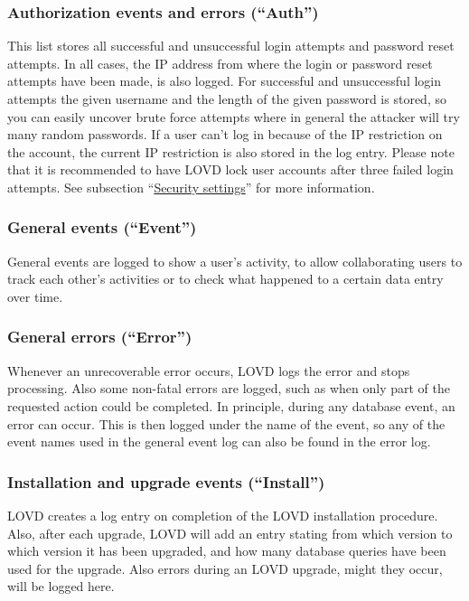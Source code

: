 \subsubsection{Authorization events and errors (``Auth'')}
This list stores all successful and unsuccessful login attempts and password reset attempts.
In all cases, the IP address from where the login or password reset attempts have been made, is also logged.
For successful and unsuccessful login attempts the given username and the length of the given password is stored,
 so you can easily uncover brute force attempts where in general the attacker will try many random passwords.
If a user can't log in because of the IP restriction on the account, the current IP restriction is also stored in the log entry.
Please note that it is recommended to have LOVD lock user accounts after three failed login attempts.
See subsection ``\hyperlink{ssec:security_settings}{Security settings}'' for more information.


\subsubsection{General events (``Event'')}
General events are logged to show a user's activity, to allow collaborating users to track each other's
 activities or to check what happened to a certain data entry over time.


\subsubsection{General errors (``Error'')}
Whenever an unrecoverable error occurs, LOVD logs the error and stops processing.
Also some non-fatal errors are logged, such as when only part of the requested action could be completed.
In principle, during any database event, an error can occur.
This is then logged under the name of the event, so any of the event names used in the general event log can also be found in the error log.

\subsubsection{Installation and upgrade events (``Install'')}
LOVD creates a log entry on completion of the LOVD installation procedure.
Also, after each upgrade, LOVD will add an entry stating from which version to which version it has been upgraded,
 and how many database queries have been used for the upgrade.
Also errors during an LOVD upgrade, might they occur, will be logged here.



